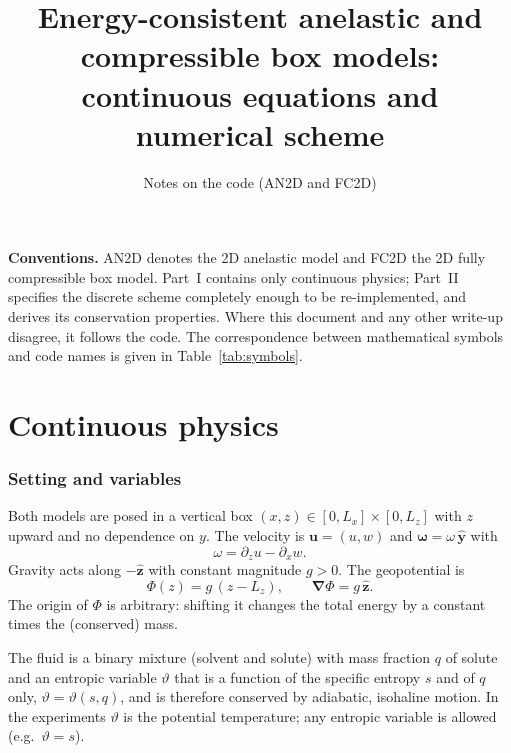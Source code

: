 \documentclass[11pt,a4paper]{article}
\title{Energy-consistent anelastic and compressible box models:\\ continuous equations and numerical scheme}
\author{Notes on the \code{TraceableEnergetics} code (AN2D and FC2D)}
\date{}
\newcommand{\vt}{\vartheta}                    %
\newcommand{\bu}{\mathbf{u}}
\newcommand{\ez}{\hat{\mathbf{z}}}
\newcommand{\bnabla}{\boldsymbol{\nabla}}
\newcommand{\bomega}{\boldsymbol{\omega}}
\begin{document}
\maketitle
\tableofcontents

\bigskip
\noindent\textbf{Conventions.}
AN2D denotes the 2D anelastic model and FC2D the 2D fully compressible box model. Part~I contains only continuous physics;
Part~II specifies the discrete scheme completely enough to be re-implemented, and derives its conservation properties.
Where this document and any other write-up disagree, it follows the code. The correspondence between mathematical symbols and code names is given in Table~\ref{tab:symbols}.

\part{Continuous physics}

\section{Setting and variables}
Both models are posed in a vertical box $(x,z)\in[0,L_x]\times[0,L_z]$ with $z$ upward and no dependence on $y$.
The velocity is $\bu=(u,w)$ and $\bomega=\omega\,\hat{\mathbf y}$ with
\begin{equation}
  \omega = \partial_z u - \partial_x w .
\end{equation}
Gravity acts along $-\ez$ with constant magnitude $g>0$. The geopotential is
\begin{equation}
  \Phi(z) = g\,(z - L_z),\qquad \bnabla\Phi = g\,\ez .
\end{equation}
The origin of $\Phi$ is arbitrary: shifting it changes the total energy by a constant times the (conserved) mass.

The fluid is a binary mixture (solvent and solute) with mass fraction $q$ of solute and an entropic
variable $\vt$ that is a function of the specific entropy $s$ and of $q$ only, $\vt=\vt(s,q)$, and is therefore
conserved by adiabatic, isohaline motion. In the experiments $\vt$ is the potential temperature; any entropic variable is allowed
(e.g.\ $\vt=s$).
\end{document}

